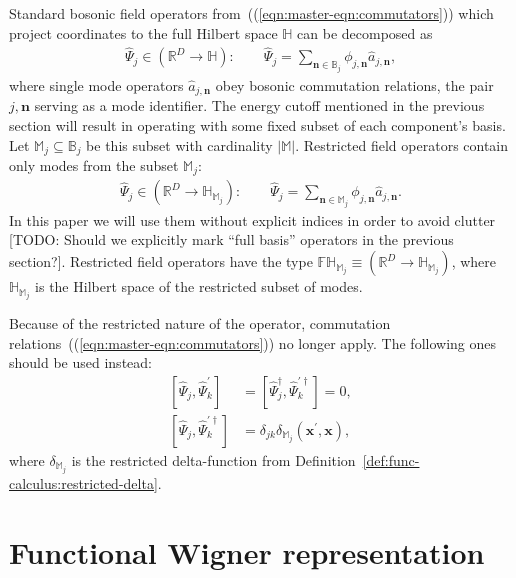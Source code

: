 \documentclass[12pt,aip,jmp,amssymb,amsmath]{revtex4-1}
\begin{document}
Standard bosonic field operators from~((\ref{eqn:master-eqn:commutators})) which project coordinates to the full Hilbert space $\mathbb{H}$ can be decomposed as
\begin{eqnarray}
    \hat{\Psi}_j \in (\mathbb{R}^D \rightarrow \mathbb{H}): \qquad
    \hat{\Psi}_j = \sum_{\boldsymbol{n} \in \mathbb{B}_j} \phi_{j,\boldsymbol{n}} \hat{a}_{j,\boldsymbol{n}},
\end{eqnarray}
where single mode operators $\hat{a}_{j,\boldsymbol{n}}$ obey bosonic commutation relations, the pair $j,\boldsymbol{n}$ serving as a mode identifier.
The energy cutoff mentioned in the previous section will result in operating with some fixed subset of each component's basis.
Let $\mathbb{M}_j \subseteq \mathbb{B}_j$ be this subset with cardinality $|\mathbb{M}|$.
Restricted field operators contain only modes from the subset $\mathbb{M}_j$:
\begin{eqnarray}
    \hat{\Psi}_j \in (\mathbb{R}^D \rightarrow \mathbb{H}_{\mathbb{M}_j}): \qquad
    \hat{\Psi}_j = \sum_{\boldsymbol{n} \in \mathbb{M}_j} \phi_{j,\boldsymbol{n}} \hat{a}_{j,\boldsymbol{n}}.
\end{eqnarray}
In this paper we will use them without explicit indices in order to avoid clutter [TODO: Should we explicitly mark ``full basis'' operators in the previous section?].
Restricted field operators have the type $\mathbb{FH}_{\mathbb{M}_j} \equiv (\mathbb{R}^D \rightarrow \mathbb{H}_{\mathbb{M}_j})$, where $\mathbb{H}_{\mathbb{M}_j}$ is the Hilbert space of the restricted subset of modes.

Because of the restricted nature of the operator, commutation relations~((\ref{eqn:master-eqn:commutators})) no longer apply.
The following ones should be used instead:
\begin{eqnarray}\label{eqn:func-operators:restricted-commutators}
    \left[ \hat{\Psi}_j, \hat{\Psi}_k^\prime \right]
    & = \left[ \hat{\Psi}_j^\dagger, \hat{\Psi}_k^{\prime\dagger} \right] = 0, \\
    \left[ \hat{\Psi}_j, \hat{\Psi}_k^{\prime\dagger} \right]
    & = \delta_{jk} \delta_{\mathbb{M}_j}(\boldsymbol{x}^\prime, \boldsymbol{x}),
\end{eqnarray}
where $\delta_{\mathbb{M}_j}$ is the restricted delta-function from Definition~\ref{def:func-calculus:restricted-delta}.



\section{Functional Wigner representation}
\end{document}
